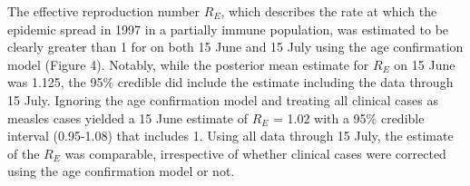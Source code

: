The effective reproduction number $R_E$, which describes the rate at which the epidemic spread in 1997 in a partially immune population, was estimated to be clearly greater than 1 for on both 15 June and 15 July using the age confirmation model (Figure 4). Notably, while the posterior mean estimate for $R_E$ on 15 June was 1.125, the 95\% credible did include the estimate including the data through 15 July. Ignoring the age
confirmation model and treating all clinical cases as measles cases yielded a 15 June estimate of $R_E$ = 1.02 with a 95\% credible interval
(0.95-1.08) that includes 1. Using all data through 15 July, the estimate of the $R_E$ was comparable, irrespective of whether clinical cases were corrected using the age confirmation model or not.